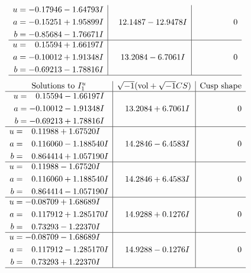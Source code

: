 \documentclass[1p]{elsarticle_modified}
\theoremstyle{definition}
\newcommand{\I}{\sqrt{-1}}
\begin{document}
$$\begin{array}{c|c|c}
\begin{aligned}
u &= -0.17946 - 1.64793 I \\
a &= -0.15251 + 1.95899 I \\
b &= -0.85684 - 1.76671 I\end{aligned}
 & \phantom{-}12.1487 - 12.9478 I & \phantom{-0.000000 } 0 \\ \hline\begin{aligned}
u &= \phantom{-}0.15594 + 1.66197 I \\
a &= -0.10012 + 1.91348 I \\
b &= -0.69213 - 1.78816 I\end{aligned}
 & \phantom{-}13.2084 - 6.7061 I & \phantom{-0.000000 } 0\\
 \hline 
 \end{array}$$\newpage$$\begin{array}{c|c|c}  
\text{Solutions to }I^u_{1}& \I (\text{vol} + \sqrt{-1}CS) & \text{Cusp shape}\\
 \hline 
\begin{aligned}
u &= \phantom{-}0.15594 - 1.66197 I \\
a &= -0.10012 - 1.91348 I \\
b &= -0.69213 + 1.78816 I\end{aligned}
 & \phantom{-}13.2084 + 6.7061 I & \phantom{-0.000000 } 0 \\ \hline\begin{aligned}
u &= \phantom{-}0.11988 + 1.67520 I \\
a &= \phantom{-}0.116060 - 1.188540 I \\
b &= \phantom{-}0.864414 + 1.057190 I\end{aligned}
 & \phantom{-}14.2846 - 6.4583 I & \phantom{-0.000000 } 0 \\ \hline\begin{aligned}
u &= \phantom{-}0.11988 - 1.67520 I \\
a &= \phantom{-}0.116060 + 1.188540 I \\
b &= \phantom{-}0.864414 - 1.057190 I\end{aligned}
 & \phantom{-}14.2846 + 6.4583 I & \phantom{-0.000000 } 0 \\ \hline\begin{aligned}
u &= -0.08709 + 1.68689 I \\
a &= \phantom{-}0.117912 + 1.285170 I \\
b &= \phantom{-}0.73293 - 1.22370 I\end{aligned}
 & \phantom{-}14.9288 + 0.1276 I & \phantom{-0.000000 } 0 \\ \hline\begin{aligned}
u &= -0.08709 - 1.68689 I \\
a &= \phantom{-}0.117912 - 1.285170 I \\
b &= \phantom{-}0.73293 + 1.22370 I\end{aligned}
 & \phantom{-}14.9288 - 0.1276 I & \phantom{-0.000000 } 0\\
 \hline 
 \end{array}$$\newpage\newpage\renewcommand{\arraystretch}{1}
\end{document}
